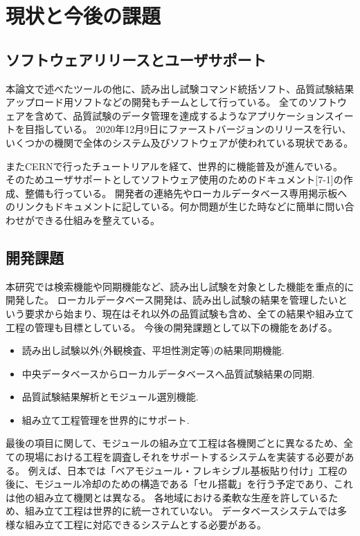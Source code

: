\section{現状と今後の課題}
\subsection{ソフトウェアリリースとユーザサポート}
本論文で述べたツールの他に、読み出し試験コマンド統括ソフト、品質試験結果アップロード用ソフトなどの開発もチームとして行っている。
全てのソフトウェアを含めて、品質試験のデータ管理を達成するようなアプリケーションスイートを目指している。
2020年12月9日にファーストバージョンのリリースを行い、いくつかの機関で全体のシステム及びソフトウェアが使われている現状である。

またCERNで行ったチュートリアルを経て、世界的に機能普及が進んでいる。
そのためユーザサポートとしてソフトウェア使用のためのドキュメント[7-1]の作成、整備も行っている。
開発者の連絡先やローカルデータベース専用掲示板へのリンクもドキュメントに記している。何か問題が生じた時などに簡単に問い合わせができる仕組みを整えている。

\subsection{開発課題}
本研究では検索機能や同期機能など、読み出し試験を対象とした機能を重点的に開発した。
ローカルデータベース開発は、読み出し試験の結果を管理したいという要求から始まり、現在はそれ以外の品質試験も含め、全ての結果や組み立て工程の管理も目標としている。
今後の開発課題として以下の機能をあげる。
\begin{itemize}
  \item 読み出し試験以外(外観検査、平坦性測定等)の結果同期機能.
  \item 中央データベースからローカルデータベースへ品質試験結果の同期.
  \item 品質試験結果解析とモジュール選別機能. 
  \item 組み立て工程管理を世界的にサポート.
\end{itemize}

最後の項目に関して、モジュールの組み立て工程は各機関ごとに異なるため、全ての現場における工程を調査しそれをサポートするシステムを実装する必要がある。
例えば、日本では「ベアモジュール・フレキシブル基板貼り付け」工程の後に、モジュール冷却のための構造である「セル搭載」を行う予定であり、これは他の組み立て機関とは異なる。
各地域における柔軟な生産を許しているため、組み立て工程は世界的に統一されていない。
データベースシステムでは多様な組み立て工程に対応できるシステムとする必要がある。

